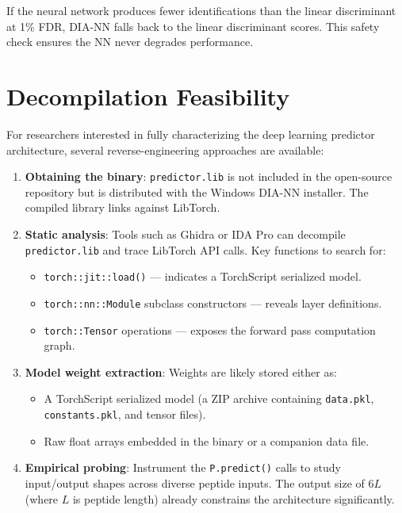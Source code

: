 \documentclass[11pt,a4paper]{article}
\begin{document}
If the neural network produces fewer identifications than the linear discriminant at 1\% FDR, DIA-NN falls back to the linear discriminant scores. This safety check ensures the NN never degrades performance.

\section{Decompilation Feasibility}
\label{sec:decomp}

For researchers interested in fully characterizing the deep learning predictor architecture, several reverse-engineering approaches are available:

\begin{enumerate}
    \item \textbf{Obtaining the binary}: \texttt{predictor.lib} is not included in the open-source repository but is distributed with the Windows DIA-NN installer. The compiled library links against LibTorch.

    \item \textbf{Static analysis}: Tools such as Ghidra or IDA Pro can decompile \texttt{predictor.lib} and trace LibTorch API calls. Key functions to search for:
    \begin{itemize}
        \item \texttt{torch::jit::load()} --- indicates a TorchScript serialized model.
        \item \texttt{torch::nn::Module} subclass constructors --- reveals layer definitions.
        \item \texttt{torch::Tensor} operations --- exposes the forward pass computation graph.
    \end{itemize}

    \item \textbf{Model weight extraction}: Weights are likely stored either as:
    \begin{itemize}
        \item A TorchScript serialized model (a ZIP archive containing \texttt{data.pkl}, \texttt{constants.pkl}, and tensor files).
        \item Raw float arrays embedded in the binary or a companion data file.
    \end{itemize}

    \item \textbf{Empirical probing}: Instrument the \texttt{P.predict()} calls to study input/output shapes across diverse peptide inputs. The output size of $6L$ (where $L$ is peptide length) already constrains the architecture significantly.


\end{enumerate}
\end{document}
